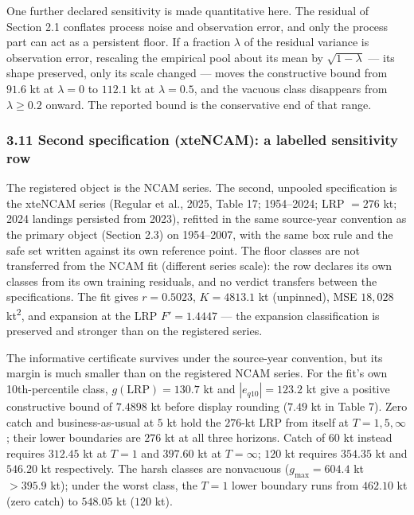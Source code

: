 \documentclass[11pt]{article}
\begin{document}
One further declared sensitivity is made quantitative here. The residual of
Section 2.1 conflates process noise and observation error, and only the process
part can act as a persistent floor. If a fraction \(\lambda\) of the residual
variance is observation error, rescaling the empirical pool about its mean by
\(\sqrt{1-\lambda}\) --- its shape preserved, only its scale changed ---
moves the constructive bound from \(91.6\) kt at \(\lambda = 0\) to
\(112.1\) kt at \(\lambda = 0.5\), and the vacuous class disappears from
\(\lambda \ge 0.2\) onward. The reported bound is the conservative end of
that range.

\subsubsection{3.11 Second specification (xteNCAM): a labelled
sensitivity
row}\label{budget-second-specification-xtencam-a-labelled-sensitivity-row}

The registered object is the NCAM series. The second, unpooled
specification is the xteNCAM series (Regular et al., 2025, Table 17;
1954--2024; LRP \(= 276\) kt; 2024 landings persisted from 2023),
refitted in the same source-year convention as the primary object
(Section 2.3) on 1954--2007, with the same box rule and the safe set
written against its own reference point. The floor
classes are not transferred from the NCAM fit (different series scale):
the row declares its own classes from its own training residuals, and no
verdict transfers between the specifications. The fit gives
\(r = 0.5023\), \(K = 4813.1\) kt (unpinned), MSE \(18{,}028\) kt\textsuperscript{2}, and
expansion at the LRP \(F' = 1.4447\) --- the expansion classification is
preserved and stronger than on the registered series.

The informative certificate survives under the source-year convention, but
its margin is much smaller than on the registered NCAM series. For the fit's
own 10th-percentile class, \(g(\mathrm{LRP}) = 130.7\) kt and
\(|e_{q10}| = 123.2\) kt give a positive constructive bound of
\(7.4898\) kt before display rounding (\(7.49\) kt in Table 7). Zero catch and business-as-usual at \(5\) kt hold the
\(276\)-kt LRP from itself at \(T=1,5,\infty\); their lower
boundaries are \(276\) kt at all three horizons. Catch of \(60\) kt
instead requires \(312.45\) kt at \(T=1\) and \(397.60\) kt at
\(T=\infty\); \(120\) kt requires \(354.35\) kt and \(546.20\)
kt respectively. The harsh classes are nonvacuous
(\(g_{\max} = 604.4\) kt \(> 395.9\) kt); under the worst class,
the \(T=1\) lower boundary runs from \(462.10\) kt (zero catch)
to \(548.05\) kt (\(120\) kt).
\end{document}
